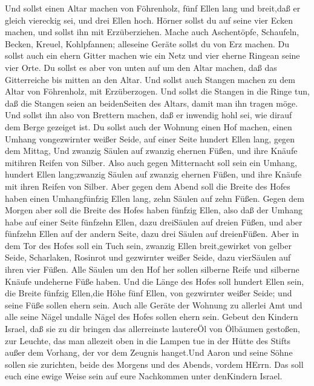  Und sollst einen Altar machen von Föhrenholz, fünf Ellen
lang und breit,daß er gleich viereckig sei, und drei Ellen hoch.
 Hörner sollst du auf seine vier Ecken machen, und sollst
ihn mit Erzüberziehen.  Mache auch Aschentöpfe, Schaufeln,
Becken, Kreuel, Kohlpfannen; alleseine Geräte sollst du von Erz machen.
 Du sollst auch ein ehern Gitter machen wie ein Netz und
vier eherne Ringean seine vier Orte.  Du sollst es aber von
unten auf um den Altar machen, daß das Gitterreiche bis mitten an den
Altar.  Und sollst auch Stangen machen zu dem Altar von
Föhrenholz, mit Erzüberzogen.  Und sollst die Stangen in die
Ringe tun, daß die Stangen seien an beidenSeiten des Altars, damit man
ihn tragen möge.  Und sollst ihn also von Brettern machen,
daß er inwendig hohl sei, wie dirauf dem Berge gezeiget ist.
 Du sollst auch der Wohnung einen Hof machen, einen Umhang
vongezwirnter weißer Seide, auf einer Seite hundert Ellen lang, gegen
dem Mittag,  Und zwanzig Säulen auf zwanzig ehernen Füßen,
und ihre Knäufe mitihren Reifen von Silber.  Also auch
gegen Mitternacht soll sein ein Umhang, hundert Ellen lang;zwanzig
Säulen auf zwanzig ehernen Füßen, und ihre Knäufe mit ihren Reifen von
Silber.  Aber gegen dem Abend soll die Breite des Hofes
haben einen Umhangfünfzig Ellen lang, zehn Säulen auf zehn Füßen.
 Gegen dem Morgen aber soll die Breite des Hofes haben
fünfzig Ellen,  also daß der Umhang habe auf einer Seite
fünfzehn Ellen, dazu dreiSäulen auf dreien Füßen,  und aber
fünfzehn Ellen auf der andern Seite, dazu drei Säulen auf dreienFüßen.
 Aber in dem Tor des Hofes soll ein Tuch sein, zwanzig
Ellen breit,gewirket von gelber Seide, Scharlaken, Rosinrot und
gezwirnter weißer Seide, dazu vierSäulen auf ihren vier Füßen.
 Alle Säulen um den Hof her sollen silberne Reife und
silberne Knäufe undeherne Füße haben.  Und die Länge des
Hofes soll hundert Ellen sein, die Breite fünfzig Ellen,die Höhe fünf
Ellen, von gezwirnter weißer Seide; und seine Füße sollen ehern sein.
 Auch alle Geräte der Wohnung zu allerlei Amt und alle
seine Nägel undalle Nägel des Hofes sollen ehern sein. 
Gebeut den Kindern Israel, daß sie zu dir bringen das allerreinste
lautereÖl von Ölbäumen gestoßen, zur Leuchte, das man allezeit oben in
die Lampen tue  in der Hütte des Stifts außer dem Vorhang,
der vor dem Zeugnis hanget.Und Aaron und seine Söhne sollen sie
zurichten, beide des Morgens und des Abends, vordem HErrn. Das soll euch
eine ewige Weise sein auf eure Nachkommen unter denKindern Israel.

